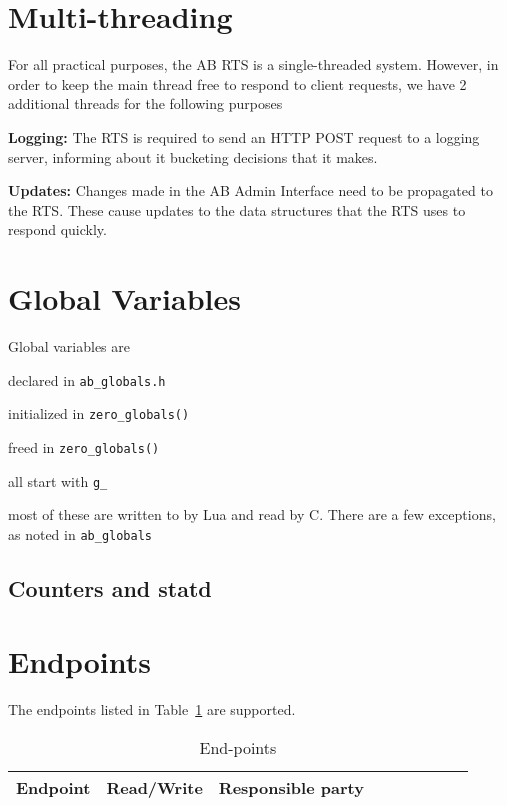 \documentclass[letterpaper]{article}
\begin{document}
\section{Multi-threading}

For all practical purposes, the AB RTS is a single-threaded system.
However, in order to keep the main thread free to respond to client requests, we
have 2 additional threads for the following purposes
\be
\item {\bf Logging:} The RTS is required to send an HTTP POST request to a
  logging server, informing about it bucketing decisions that it makes. 
\item {\bf Updates:} Changes made in the AB Admin Interface need to be
  propagated to the RTS. These cause updates to the data structures that the RTS
  uses to respond quickly.
  \ee

\section{Global Variables}

Global variables are 
\bi
\item declared in \verb+ab_globals.h+
\item initialized in \verb+zero_globals()+
\item freed in \verb+zero_globals()+
\item all start with \verb+g_+
\item most of these are written to by Lua and read by C. There are a few
  exceptions, as noted in \verb+ab_globals+
\ei

\subsection{Counters and statd}

\section{Endpoints}
The endpoints listed in Table~\ref{tbl_endpoints} are supported.
\begin{table}[hb]
\centering
\begin{tabular}{|l||l|l|l|l|l|l|l|l|}  \hline \hline
  {\bf Endpoint } & {\bf Read/Write} & {\bf Responsible party} \\ \hline \hline

\hline
\end{tabular}
\caption{End-points}
\label{tbl_endpoints}
\end{table}
\end{document}
